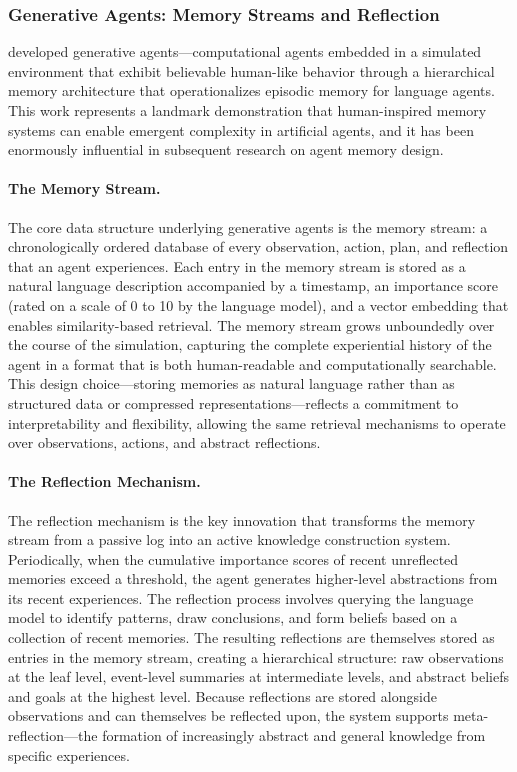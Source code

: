 \documentclass[11pt,letterpaper]{article}
\begin{document}
\subsubsection{Generative Agents: Memory Streams and Reflection}

\cite{park2023generative} developed generative agents---computational agents embedded in a simulated environment that exhibit believable human-like behavior through a hierarchical memory architecture that operationalizes episodic memory for language agents. This work represents a landmark demonstration that human-inspired memory systems can enable emergent complexity in artificial agents, and it has been enormously influential in subsequent research on agent memory design.

\paragraph{The Memory Stream.} The core data structure underlying generative agents is the memory stream: a chronologically ordered database of every observation, action, plan, and reflection that an agent experiences. Each entry in the memory stream is stored as a natural language description accompanied by a timestamp, an importance score (rated on a scale of 0 to 10 by the language model), and a vector embedding that enables similarity-based retrieval. The memory stream grows unboundedly over the course of the simulation, capturing the complete experiential history of the agent in a format that is both human-readable and computationally searchable. This design choice---storing memories as natural language rather than as structured data or compressed representations---reflects a commitment to interpretability and flexibility, allowing the same retrieval mechanisms to operate over observations, actions, and abstract reflections.

\paragraph{The Reflection Mechanism.} The reflection mechanism is the key innovation that transforms the memory stream from a passive log into an active knowledge construction system. Periodically, when the cumulative importance scores of recent unreflected memories exceed a threshold, the agent generates higher-level abstractions from its recent experiences. The reflection process involves querying the language model to identify patterns, draw conclusions, and form beliefs based on a collection of recent memories. The resulting reflections are themselves stored as entries in the memory stream, creating a hierarchical structure: raw observations at the leaf level, event-level summaries at intermediate levels, and abstract beliefs and goals at the highest level. Because reflections are stored alongside observations and can themselves be reflected upon, the system supports meta-reflection---the formation of increasingly abstract and general knowledge from specific experiences.
\end{document}

